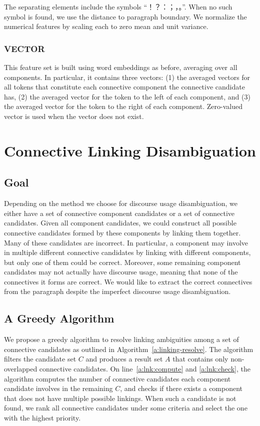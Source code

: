 The separating elements include the symbols ``！？：；，。''.
When no such symbol is found, we use the distance to paragraph boundary.
We normalize the numerical features by scaling each to zero mean and unit variance.

\subsubsection{VECTOR}

This feature set is built using word embeddings as before, averaging over all components.
In particular, it contains three vectors: (1) the averaged vectors
for all tokens that constitute each connective component the connective candidate has,
(2) the averaged vector for the
token to the left of each component, and (3) the averaged vector for the token to the
right of each component. Zero-valued vector is used when the vector does not exist.

\section{Connective Linking Disambiguation}
\label{s:linking-disambig}

\subsection{Goal}

Depending on the method we choose for discourse usage disambiguation, we
either have a set of connective component candidates or a set of connective
candidates. Given all component candidates, we could construct all possible
connective candidates formed by these components by linking them together.
Many of these candidates are incorrect. In particular, a component may involve in
multiple different connective candidates by linking with different components,
but only one of them could be correct. Moreover, some remaining component
candidates may not actually have discourse usage, meaning that none of
the connectives it forms are correct. We would like to extract the
correct connectives from the paragraph despite the imperfect discourse usage
disambiguation.

\subsection{A Greedy Algorithm}

We propose a greedy algorithm to resolve linking ambiguities among a set of
connective candidates as outlined in Algorithm~\ref{a:linking-resolve}.
The algorithm filters the candidate set $C$ and produces a result set $A$ that
contains only non-overlapped connective candidates. On line~\ref{a:lnk:compute}
and \ref{a:lnk:check}, the algorithm computes the number of connective candidates
each component candidate involves in the remaining $C$, and checks if there exists
a component that does not have multiple possible linkings. When such a candidate
is not found, we rank all connective candidates under some criteria
and select the one with the highest priority.

